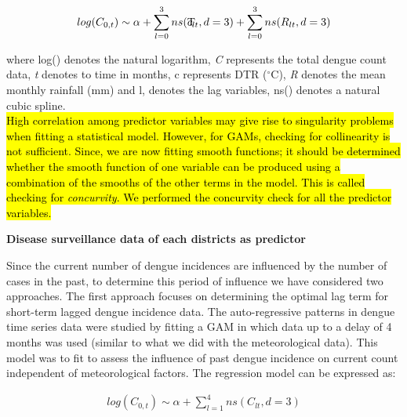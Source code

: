 \documentclass{bmcart}
\begin{document}
\begin{equation}
\begin{aligned}
\label{eq:meteorological}
log (C_{0,t}) \sim \alpha +  \sum_{l=0}^{3} ns(\rlap{T}c _ {lt}, d =3) + \sum_{l=0}^{3} ns(R_ {lt}, d =3)
\end{aligned}
\end{equation}


where log() denotes the natural logarithm, \textit{C} represents the total dengue count data, \textit{t} denotes to time in months, c represents DTR ($^{\circ}$C), \textit{R} denotes the mean monthly rainfall (mm) and  l, denotes the lag variables, ns() denotes a natural cubic spline. \\

\hl{High correlation among predictor variables may give rise to singularity problems when fitting a statistical model. However, for GAMs, checking for collinearity is not sufficient. Since, we are now fitting smooth functions; it should be determined whether the smooth function of one variable can be produced using a combination of the smooths of the other terms in the model. This is called checking for \textit{concurvity}. We performed the concurvity check for all the predictor variables.}

\textbf{Disease surveillance data of each districts as predictor}

Since the current number of dengue incidences are influenced by the number of cases in the past, to determine this period of influence we have considered two approaches. The first approach focuses on determining the optimal lag term for short-term lagged dengue incidence data. The auto-regressive patterns in dengue time series data were studied by fitting a GAM in which data up to a delay of 4 months was used (similar to what we did with the meteorological data). This model was to fit to assess the influence of past dengue incidence on current count independent of meteorological factors. The regression model can be expressed as:

\begin{equation}
\begin{aligned}
\label{eq:short}
log (C_{0,t}) \sim \alpha + \sum_{l=1}^{4} ns(C_ {lt}, d =3) 
\end{aligned}
\end{equation}
\end{document}
